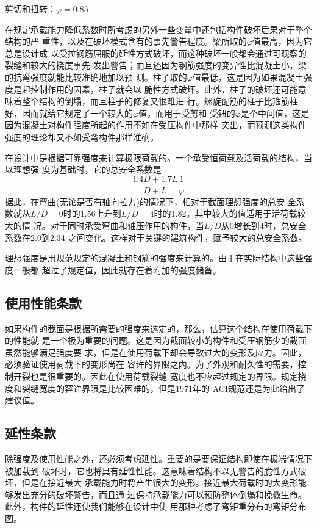 \documentclass[12pt,a4paper]{book}
\begin{document}
剪切和扭转：$\varphi=0.85$

在规定承载能力降低系数时所考虑的另外一些变量中还包括构件破坏后果对于整个结构的严
重性，以及在破坏模式含有的事先警告程度。梁所取的$\varphi$值最高，因为它总是设计成
以受拉钢筋屈服的延性方式破坏，而这种破坏一般都会通过可观察的裂缝和较大的挠度事先
发出警告；而且还因为钢筋强度的变异性比混凝土小，梁的抗弯强度就能比较准确地加以预
测。柱子取的$\varphi$值最低，这是因为如果混凝土强度是起控制作用的因素，柱子就会以
脆性方式破坏。此外，柱子的破坏还可能意味着整个结构的倒塌，而且柱子的修复又很难进
行。螺旋配筋的柱子比箍筋柱好，因而就给它规定了一个较大的$\varphi$值。而用于受剪和
受钮的$\varphi$是个中间值，这是因为混凝土对构件强度所起的作用不如在受压构件中那样
突出，而预测这类构件强度的理论却又不如受弯构件那样准确。

在设计中是根据可靠强度来计算极限荷载的。一个承受恒荷载及活荷载的结构，当以理想强
度为基础时，它的总安全系数是
\begin{equation}
  \label{eq:4} \frac{1.4D+1.7L}{D+L}\frac{1}{\varphi}
\end{equation}据此，在弯曲(无论是否有轴向拉力)的情况下，相对于截面理想强度的总安
全系数就从$L/D=0$时的1.56上升到$L/D=4$时的1.82。其中较大的值适用于活荷载较大的情
况。对于同时承受弯曲和轴压作用的构件，当$L/D$从0增长到4时，总安全系数在2.0到2.34
之间变化。这样对于关键的建筑构件，赋予较大的总安全系数。

理想强度是用规范规定的混凝土和钢筋的强度来计算的。由于在实际结构中这些强度一般都
超过了规定值，因此就存在着附加的强度储备。

\subsection{使用性能条款}

如果构件的截面是根据所需要的强度来选定的，那么，估算这个结构在使用荷载下的性能就
是一个极为重要的问题。这是因为截面较小的构件和受压钢筋少的截面虽然能够满足强度要
求，但是在使用荷载下却会导致过大的变形及应力。因此，必须验证使用荷载下的变形尚在
容许的界限之内。为了外观和耐久性的需要，控制开裂也是很重要的。因此在使用荷载裂缝
宽度也不应超过规定的界限。规定挠度和裂缝宽度的容许界限是比较困难的，但是1971年的
ACI规范还是为此给出了建议值。

\subsection{延性条款}

除强度及使用性能之外，还必须考虑延性。重要的是要保证结构即使在极端情况下被加载到
破坏时，它也将具有延性性能。这意味着结构不以无警告的脆性方式破坏，但是在接近最大
承载能力时将产生很大的变形。接近最大荷载时的大变形能够发出充分的破坏警告，而且通
过保持承载能力可以预防整体倒塌和挽救生命。此外，构件的延性还使我们能够在设计中使
用那种考虑了弯矩重分布的弯矩分布图。
\end{document}
